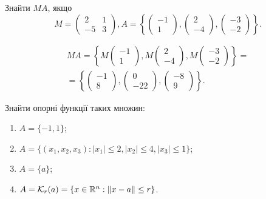 \begin{problem}
    Знайти $MA$, якщо \[ M = \begin{pmatrix} 2 & 1 \\ -5 & 3 \end{pmatrix}, A = \left\{ \begin{pmatrix} -1 \\ 1 \end{pmatrix}, \begin{pmatrix} 2 \\ -4 \end{pmatrix}, \begin{pmatrix} -3 \\ -2 \end{pmatrix} \right\}. \]
\end{problem}

\begin{solution}
    \begin{multline*} 
        M A = \left\{ M \begin{pmatrix} -1 \\ 1 \end{pmatrix}, M \begin{pmatrix} 2 \\ -4 \end{pmatrix}, M \begin{pmatrix} -3 \\ -2 \end{pmatrix} \right\} = \\
        = \left\{ \begin{pmatrix} -1 \\ 8 \end{pmatrix}, \begin{pmatrix} 0 \\ -22 \end{pmatrix}, \begin{pmatrix} -8 \\ 9 \end{pmatrix} \right\}.
    \end{multline*}        
\end{solution}


\begin{problem}
    Знайти опорні функції таких множин:
    \begin{enumerate}
        \item $A = \{ -1, 1 \}$;
        \item $A = \{ (x_1, x_2, x_3) : |x_1| \le 2, |x_2| \le  4, |x_3| \le 1 \}$;
        \item $A = \{ a \}$;
        \item $A = \mathcal{K}_r(a) = \{ x\in \mathbb{R}^n : \| x - a \| \le r \}$.
    \end{enumerate}
\end{problem}

